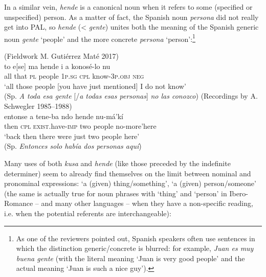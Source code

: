 \documentclass[output=paper,colorlinks,citecolor=brown]{langscibook}
\begin{document}
In a similar vein, \textit{hende} is a canonical noun when it refers to some (specified or unspecified) person. As a matter of fact, the Spanish noun \textit{persona} did not really get into PAL, so \textit{hende} (< \textit{gente}) unites both the meaning of the Spanish generic noun \textit{gente} ‘people’ and the more concrete \textit{persona} ‘person’:\footnote{As one of the reviewers pointed out, Spanish speakers often use sentences in which the distinction generic/concrete is blurred: for example, \textit{Juan es muy buena gente} (with the literal meaning ‘Juan is very good people’ and the actual meaning ‘Juan is such a nice guy’). }

\ea\label{ex:gut14}(Fieldwork M. Gutiérrez Maté 2017)\\
\gll to e[se] ma hende i a konosé-lo nu \\
all that \textsc{pl} people 1\textsc{p.sg} \textsc{cpl} know-3\textsc{p.obj} \textsc{neg} \\
\glt ‘all those people [you have just mentioned] I do not know’ \\
(Sp. \textit{A toda esa gente }[/\textit{a todas esas personas}] \textit{no las conozco})
\ex\label{ex:gut15}(Recordings by A. Schwegler 1985--1988)\\
\gll entonse a tene-ba ndo hende nu-má’kí \\
then \textsc{cpl} \textsc{exist}.have-\textsc{imp} two people no-more’here \\
\glt ‘back then there were just two people here’ \\
(Sp. \textit{Entonces solo había dos personas aquí})
\z

Many uses of both \textit{kusa} and \textit{hende} (like those preceded by the indefinite determiner) seem to already find themselves on the limit between nominal and pronominal expressions: ‘a (given) thing\slash something’, ‘a (given) person\slash someone’ (the same is actually true for noun phrases with ‘thing’ and ‘person’ in Ibero\hyp Romance -- and many other languages -- when they have a non-specific reading, i.e. when the potential referents are interchangeable):
\end{document}

